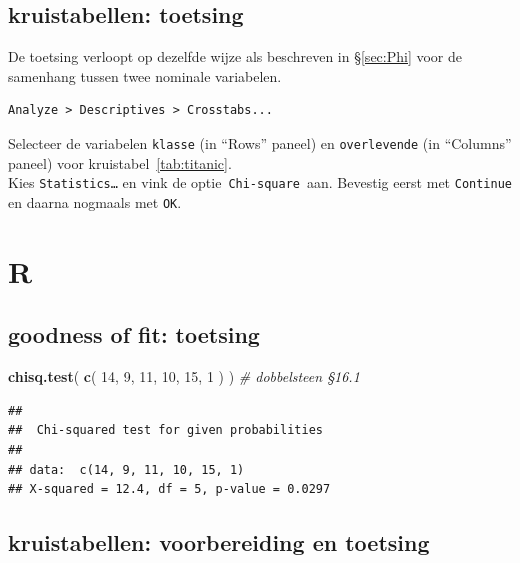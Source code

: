 \documentclass[
]{book}
\newenvironment{Shaded}{\begin{snugshade}}{\end{snugshade}}
\newcommand{\CommentTok}[1]{\textcolor[rgb]{0.56,0.35,0.01}{\textit{#1}}}
\newcommand{\DecValTok}[1]{\textcolor[rgb]{0.00,0.00,0.81}{#1}}
\newcommand{\KeywordTok}[1]{\textcolor[rgb]{0.13,0.29,0.53}{\textbf{#1}}}
\newcommand{\NormalTok}[1]{#1}
\begin{document}
\hypertarget{kruistabellen-toetsing}{%
\subsection{kruistabellen: toetsing}\label{kruistabellen-toetsing}}

De toetsing verloopt op dezelfde wijze als beschreven in
§\ref{sec:Phi} voor
de samenhang tussen twee nominale variabelen.

\begin{verbatim}
Analyze > Descriptives > Crosstabs...
\end{verbatim}

Selecteer de variabelen \texttt{klasse} (in ``Rows'' paneel) en \texttt{overlevende} (in
``Columns'' paneel) voor
kruistabel~\ref{tab:titanic}.\\
Kies \texttt{Statistics\ldots{}} en vink de optie~\texttt{Chi-square}~aan. Bevestig eerst met
\texttt{Continue} en daarna nogmaals met \texttt{OK}.

\hypertarget{r-16}{%
\section{R}\label{r-16}}

\hypertarget{goodness-of-fit-toetsing-1}{%
\subsection{goodness of fit: toetsing}\label{goodness-of-fit-toetsing-1}}

\begin{Shaded}
\begin{Highlighting}[]
\KeywordTok{chisq.test}\NormalTok{( }\KeywordTok{c}\NormalTok{( }\DecValTok{14}\NormalTok{, }\DecValTok{9}\NormalTok{, }\DecValTok{11}\NormalTok{, }\DecValTok{10}\NormalTok{, }\DecValTok{15}\NormalTok{, }\DecValTok{1}\NormalTok{ ) ) }\CommentTok{\# dobbelsteen §16.1}
\end{Highlighting}
\end{Shaded}

\begin{verbatim}
## 
##  Chi-squared test for given probabilities
## 
## data:  c(14, 9, 11, 10, 15, 1)
## X-squared = 12.4, df = 5, p-value = 0.0297
\end{verbatim}

\hypertarget{kruistabellen-voorbereiding-en-toetsing}{%
\subsection{kruistabellen: voorbereiding en toetsing}\label{kruistabellen-voorbereiding-en-toetsing}}
\end{document}
